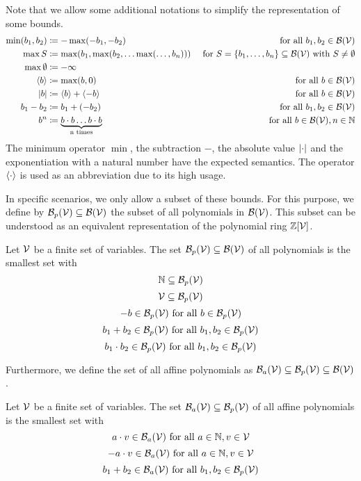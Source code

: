 Note that we allow some additional notations to simplify the representation of some bounds.
\begin{align*}
  \min(b_1,b_2) &\coloneqq -\max(-b_1,-b_2) & \text{ for all } b_1, b_2 \in \mathcal{B}(\mathcal{V}) \\
  \max S &\coloneqq \max(b_1, \max(b_2, \dots \max(\dots, b_n))) & \text{ for } S = \lbrace b_1, \dots, b_n \rbrace \subseteq \mathcal{B}(\mathcal{V}) \text{ with } S \neq \emptyset \\
  \max \emptyset &\coloneqq -\infty \\
  \langle b\rangle &\coloneqq \max(b,0) & \text{ for all } b \in \mathcal{B}(\mathcal{V}) \\
  \left|b\right| &\coloneqq \langle b\rangle + \langle-b\rangle & \text{ for all } b \in \mathcal{B}(\mathcal{V}) \\
  b_1 - b_2 &\coloneqq b_1 + (-b_2) & \text{ for all } b_1, b_2 \in \mathcal{B}(\mathcal{V}) \\
  b^n &\coloneqq \underbrace{b \cdot b \dots b \cdot b}_\text{n times} & \text{ for all } b \in \mathcal{B}(\mathcal{V}), n \in \mathbb{N}
\end{align*}
The minimum operator $\min$, the subtraction $-$, the absolute value $\left|\cdot\right|$ and the exponentiation with a natural number have the expected semantics.
The operator $\langle\cdot\rangle$ is used as an abbreviation due to its high usage.

In specific scenarios, we only allow a subset of these bounds.
For this purpose, we define by $\mathcal{B}_p(\mathcal{V}) \subseteq \mathcal{B}(\mathcal{V})$ the subset of all polynomials in $\mathcal{B}(\mathcal{V})$.
This subset can be understood as an equivalent representation of the polynomial ring $\mathbb{Z}[\mathcal{V}]$.
\begin{definition}
  Let $\mathcal{V}$ be a finite set of variables.
  The set $\mathcal{B}_p(\mathcal{V}) \subseteq \mathcal{B}(\mathcal{V})$ of all polynomials is the smallest set with
  \[ \mathbb{N} \subseteq \mathcal{B}_p(\mathcal{V}) \] 
  \[ \mathcal{V} \subseteq \mathcal{B}_p(\mathcal{V}) \] 
  \[ -b \in \mathcal{B}_p(\mathcal{V}) \text{ for all } b \in \mathcal{B}_p(\mathcal{V}) \] 
  \[ b_1 + b_2 \in \mathcal{B}_p(\mathcal{V}) \text{ for all } b_1, b_2 \in \mathcal{B}_p(\mathcal{V}) \] 
  \[ b_1 \cdot b_2 \in \mathcal{B}_p(\mathcal{V}) \text{ for all } b_1, b_2 \in \mathcal{B}_p(\mathcal{V}) \] 
\end{definition}
Furthermore, we define the set of all affine polynomials as $\mathcal{B}_a(\mathcal{V}) \subseteq \mathcal{B}_p(\mathcal{V}) \subseteq \mathcal{B}(\mathcal{V})$. 
\begin{definition}
  Let $\mathcal{V}$ be a finite set of variables.
  The set $\mathcal{B}_a(\mathcal{V}) \subseteq \mathcal{B}_p(\mathcal{V})$ of all affine polynomials is the smallest set with
  \[ a \cdot v \in \mathcal{B}_a(\mathcal{V}) \text{ for all } a \in \mathbb{N}, v \in \mathcal{V} \] 
  \[ -a \cdot v \in \mathcal{B}_a(\mathcal{V}) \text{ for all } a \in \mathbb{N}, v \in \mathcal{V} \] 
  \[ b_1 + b_2 \in \mathcal{B}_a(\mathcal{V}) \text{ for all } b_1, b_2 \in \mathcal{B}_p(\mathcal{V}) \] 
\end{definition}

